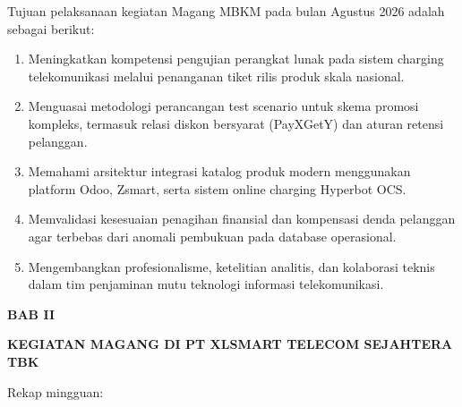 \documentclass[12pt,a4paper]{article}
\begin{document}
\vspace{0.3cm}
Tujuan pelaksanaan kegiatan Magang MBKM pada bulan Agustus 2026 adalah sebagai berikut:
\begin{enumerate}[label=\arabic*.,leftmargin=1.5em,itemsep=2pt,topsep=2pt]
    \item Meningkatkan kompetensi pengujian perangkat lunak pada sistem charging telekomunikasi melalui penanganan tiket rilis produk skala nasional.
    \item Menguasai metodologi perancangan test scenario untuk skema promosi kompleks, termasuk relasi diskon bersyarat (PayXGetY) dan aturan retensi pelanggan.
    \item Memahami arsitektur integrasi katalog produk modern menggunakan platform Odoo, Zsmart, serta sistem online charging Hyperbot OCS.
    \item Memvalidasi kesesuaian penagihan finansial dan kompensasi denda pelanggan agar terbebas dari anomali pembukuan pada database operasional.
    \item Mengembangkan profesionalisme, ketelitian analitis, dan kolaborasi teknis dalam tim penjaminan mutu teknologi informasi telekomunikasi.
\end{enumerate}

\clearpage
\begin{center}
    {\bfseries\large BAB II\par}
    {\bfseries\large KEGIATAN MAGANG DI PT XLSMART TELECOM SEJAHTERA TBK\par}
\end{center}
\vspace{0.2cm}

\vspace{0.1cm}
\noindent Rekap mingguan:
\end{document}
